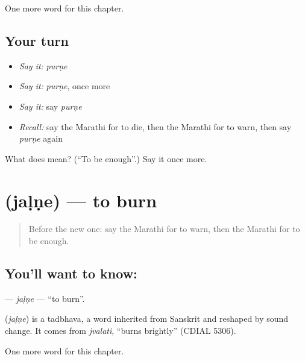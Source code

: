 \begin{grammarlens}[title={What you've built}]
One more word for this chapter.
\end{grammarlens}

\subsection*{Your turn}
\begin{itemize}
\raggedright
  \item \emph{Say it:} \emph{purṇe}
  \item \emph{Say it:} \emph{purṇe}, once more
  \item \emph{Say it:} say \emph{purṇe}
  \item \emph{Recall:} say the Marathi for to die, then the Marathi for to warn, then say \emph{purṇe} again
\end{itemize}

\begin{tcolorbox}[breakable,colback=teal!4,colframe=teal!35!black,title={Before you move on}]
What does  mean? (\textquotedblleft{}To be enough\textquotedblright{}.) Say it once more.
\end{tcolorbox}
\section[\texorpdfstring{\mr{जळणे} (jaḷṇe)}{जळणे (jaḷṇe)}]{ (jaḷṇe) — to burn}

\label{lesson:MR-C195-jalne}



\begin{quote}
Before the new one: say the Marathi for to warn, then the Marathi for to be enough.
\end{quote}

\subsection*{You'll want to know: }
\textbf{} — \emph{jaḷṇe} — \textquotedblleft{}to burn\textquotedblright{}.

\begin{cousinweb}
\textbf{} (\emph{jaḷṇe}) is a tadbhava, a word inherited from Sanskrit and reshaped by sound change. It comes from \emph{jvalati}, \textquotedblleft{}burns brightly\textquotedblright{} (CDIAL 5306).
\end{cousinweb}

\begin{grammarlens}[title={What you've built}]
One more word for this chapter.
\end{grammarlens}

